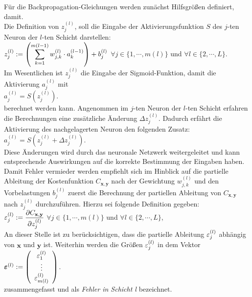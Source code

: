 \noindent
Für die Backpropagation-Gleichungen werden zunächst Hilfsgrößen definiert, damit. \\
Die Definition von $z_j^{(l)}$, soll die Eingabe der Aktivierungsfunktion $S$ des $j$-ten Neuron der $l$-ten Schicht darstellen:
\\[0.2cm]
\hspace*{1.3cm}
$\displaystyle z_j^{(l)} := \left(\sum\limits_{k=1}^{m(l-1)}  w_{j,k}^{(l)} \cdot a_k^{(l-1)}\right) + b_j^{(l)}$
\quad $\forall j \in \{1, \cdots, m(l)\}$ und $\forall l \in \{2,\cdots,L\}$.
\\[0.2cm]
Im Wesentlichen ist $z_j^{(l)}$ die Eingabe der Sigmoid-Funktion, damit die Aktivierung $a_j^{(l)}$ mit
\\[0.2cm]
\hspace*{1.3cm}
$a_j^{(l)} = S(z_j^{(l)})$.
\\[0.2cm]
berechnet werden kann. Angenommen im $j$-ten Neuron der $l$-ten Schicht erfahren die Berechnungen eine zusätzliche Änderung $\Delta z_j^{(l)}$.  Dadurch erfährt die Aktivierung des nachgelagerten Neuron den folgenden Zusatz: 
\\[0.2cm]
\hspace*{1.3cm}
$a_j^{(l)}=S(z_j^{(l)}+\Delta z_j^{(l)})$.
\\[0.2cm]
Diese Änderungen wird durch das neuronale Netzwerk weitergeleitet und kann entsprechende Auswirkungen auf die korrekte Bestimmung der Eingaben haben. Damit Fehler vermieder werden empfiehlt sich im Hinblick auf die partielle Ableitung der Kostenfunktion $C_{\mathbf{x},\mathbf{y}}$ nach der Gewichtung $w_{j,k}^{(l)}$ und den Vorbelastungen $b_j^{(l)}$ zuerst die Berechnung der partiellen Ableitung von $C_{\mathbf{x},\mathbf{y}}$ nach $z_j^{(l)}$ durchzuführen. Hierzu sei folgende Definition gegeben:
\\[0.2cm]
\hspace*{1.3cm}
$\displaystyle\varepsilon_j^{(l)} := \frac{\partial C_{\mathbf{x}, \mathbf{y}}}{\partial z_j^{(l)}}$ \quad $\forall j \in \{1, \cdots, m(l)\}$ und $\forall l \in \{2,\cdots, L\}$,
\\[0.2cm]
An dieser Stelle ist zu berücksichtigen, dass die partielle Ableitung $\displaystyle\varepsilon_j^{(l)}$ abhängig von $\mathbf{x}$ und $\mathbf{y}$ ist. Weiterhin werden die Größen $\displaystyle\varepsilon_j^{(l)}$ in dem Vektor
\\[0.2cm]
\hspace*{1.3cm}
$\boldsymbol{\varepsilon}^{(l)} := \left(
  \begin{array}[c]{c}
    \varepsilon_1^{(l)}      \\
    \vdots             \\
    \varepsilon_{m(l)}^{(l)}  
  \end{array}
  \right)
$.
\\[0.2cm]
zusammengefasst und als \textit{Fehler in Schicht l} bezeichnet.

